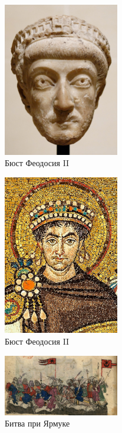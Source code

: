 \begin{figure}[ht]
    \centering
    \includegraphics[width=0.45\textwidth]{img/vizant/1_800px-Theodosius_II_Louvre_Ma1036.jpg}
    \caption{Бюст Феодосия II}
    \label{fig:theodosius}
\end{figure}

\begin{figure}[ht]
    \centering
    \includegraphics[width=0.45\textwidth]{img/vizant/2_Mosaic_of_Justinianus_I_-_Basilica_San_Vitale_(Ravenna).jpg}
    \caption{Бюст Феодосия II}
    \label{fig:justinianus}
\end{figure}

\begin{figure}[ht]
    \centering
    \includegraphics[width=0.45\textwidth]{img/vizant/3_Hayton_BNF886_9v.jpg}
    \caption{Битва при Ярмуке}
    \label{fig:yarmuka}
\end{figure}

